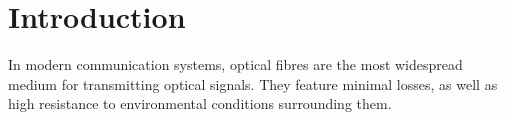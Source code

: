 \documentclass{standalone}
\begin{document}
\chapter{Introduction}
\setcounter{page}\thestranica


In modern communication systems, optical fibres are the most widespread medium for transmitting optical signals. They feature minimal losses, as well as high resistance to environmental conditions surrounding them.



\setcounter{stranica}{\thepage}
\addtocounter{stranica}{1}
\end{document}
